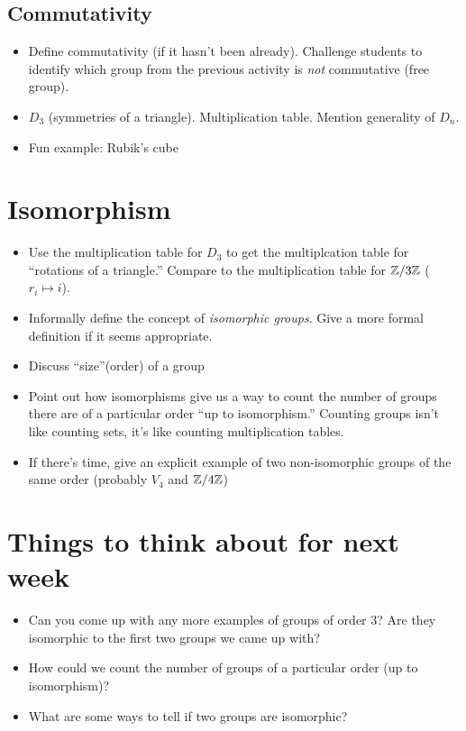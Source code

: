 \documentclass{article}
\begin{document}
\subsection*{Commutativity}
\begin{itemize}
\item Define commutativity (if it hasn't been already). Challenge
  students to identify which group from the previous activity is
  \emph{not} commutative (free group).

\item $D_3$ (symmetries of a triangle). Multiplication table. Mention
  generality of $D_n$. 

\item Fun example: Rubik's cube
\end{itemize}

\section*{Isomorphism}

\begin{itemize}

\item Use the multiplication table for $D_3$ to get the multiplcation
  table for ``rotations of a triangle.'' Compare to the multiplication
  table for $\mathbb{Z}/3\mathbb{Z}$ ($r_i \mapsto i$). 

\item Informally define the concept of \emph{isomorphic groups}. Give
  a more formal definition if it seems appropriate.

\item Discuss ``size''(order) of a group

\item Point out how isomorphisms give us a way to count the number of
  groups there are of a particular order ``up to isomorphism.''
  Counting groups isn't like counting sets, it's like counting
  multiplication tables.

\item If there's time, give an explicit example of two non-isomorphic
  groups of the same order (probably $V_4$ and $\mathbb{Z}/4\mathbb{Z}$)
 
\end{itemize}

\section*{Things to think about for next week}

\begin{itemize}

\item Can you come up with any more examples of groups of order $3$?
  Are they isomorphic to the first two groups we came up with?

\item How could we count the number of groups of a particular order
  (up to isomorphism)?

\item What are some ways to tell if two groups are isomorphic?

\end{itemize}
\end{document}
